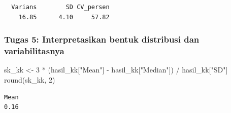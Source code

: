 \documentclass[
  indonesian,
  letterpaper,
]{book}
\newenvironment{Shaded}{\begin{snugshade}}{\end{snugshade}}
\newcommand{\DecValTok}[1]{\textcolor[rgb]{0.68,0.00,0.00}{#1}}
\newcommand{\FunctionTok}[1]{\textcolor[rgb]{0.28,0.35,0.67}{#1}}
\newcommand{\NormalTok}[1]{\textcolor[rgb]{0.00,0.23,0.31}{#1}}
\newcommand{\OtherTok}[1]{\textcolor[rgb]{0.00,0.23,0.31}{#1}}
\newcommand{\SpecialCharTok}[1]{\textcolor[rgb]{0.37,0.37,0.37}{#1}}
\newcommand{\StringTok}[1]{\textcolor[rgb]{0.13,0.47,0.30}{#1}}
\begin{document}
\begin{verbatim}
  Varians        SD CV_persen 
    16.85      4.10     57.82 
\end{verbatim}

\subsubsection{Tugas 5: Interpretasikan bentuk distribusi dan
variabilitasnya}\label{tugas-5-interpretasikan-bentuk-distribusi-dan-variabilitasnya}

\begin{Shaded}
\begin{Highlighting}[]
\NormalTok{sk\_kk }\OtherTok{\textless{}{-}} \DecValTok{3} \SpecialCharTok{*}\NormalTok{ (hasil\_kk[}\StringTok{"Mean"}\NormalTok{] }\SpecialCharTok{{-}}\NormalTok{ hasil\_kk[}\StringTok{"Median"}\NormalTok{]) }\SpecialCharTok{/}\NormalTok{ hasil\_kk[}\StringTok{"SD"}\NormalTok{]}
\FunctionTok{round}\NormalTok{(sk\_kk, }\DecValTok{2}\NormalTok{)}
\end{Highlighting}
\end{Shaded}

\begin{verbatim}
Mean 
0.16 
\end{verbatim}
\end{document}
